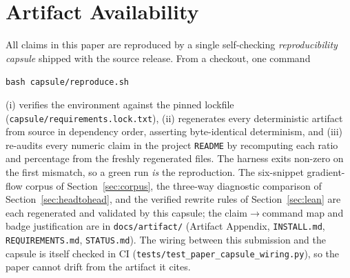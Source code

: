 \documentclass{article}
\begin{document}
\section*{Artifact Availability}
\label{sec:artifact}
All claims in this paper are reproduced by a single self-checking
\emph{reproducibility capsule} shipped with the source release. From a
checkout, one command
%
\begin{center}
\texttt{bash capsule/reproduce.sh}
\end{center}
%
(i) verifies the environment against the pinned lockfile
(\texttt{capsule/requirements.lock.txt}), (ii) regenerates every
deterministic artifact from source in dependency order, asserting
byte-identical determinism, and (iii) re-audits every numeric claim in the
project \texttt{README} by recomputing each ratio and percentage from the
freshly regenerated files. The harness exits non-zero on the first mismatch,
so a green run \emph{is} the reproduction. The six-snippet gradient-flow
corpus of Section~\ref{sec:corpus}, the three-way diagnostic comparison of
Section~\ref{sec:headtohead}, and the verified rewrite rules of
Section~\ref{sec:lean} are each regenerated and validated by this capsule;
the claim$\to$command map and badge justification are in
\texttt{docs/artifact/} (Artifact Appendix, \texttt{INSTALL.md},
\texttt{REQUIREMENTS.md}, \texttt{STATUS.md}). The wiring between this
submission and the capsule is itself checked in CI
(\texttt{tests/test\_paper\_capsule\_wiring.py}), so the paper cannot drift
from the artifact it cites.
\end{document}
